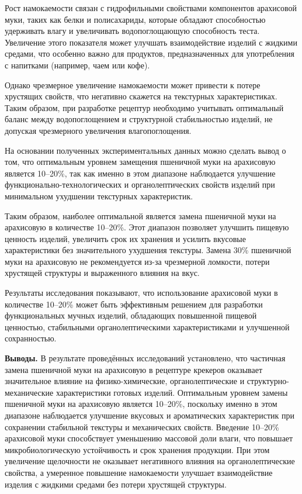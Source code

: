\begin{multicols}{2}
Рост намокаемости связан с гидрофильными свойствами компонентов
арахисовой муки, таких как белки и полисахариды, которые обладают
способностью удерживать влагу и увеличивать водопоглощающую способность
теста. Увеличение этого показателя может улучшать взаимодействие изделий
с жидкими средами, что особенно важно для продуктов, предназначенных для
употребления с напитками (например, чаем или кофе).

Однако чрезмерное увеличение намокаемости может привести к потере
хрустящих свойств, что негативно скажется на текстурных характеристиках.
Таким образом, при разработке рецептур необходимо учитывать оптимальный
баланс между водопоглощением и структурной стабильностью изделий, не
допуская чрезмерного увеличения влагопоглощения.

На основании полученных экспериментальных данных можно сделать вывод о
том, что оптимальным уровнем замещения пшеничной муки на арахисовую
является 10--20\%, так как именно в этом диапазоне наблюдается улучшение
функционально-технологических и органолептических свойств изделий при
минимальном ухудшении текстурных характеристик.

Таким образом, наиболее оптимальной является замена пшеничной муки на
арахисовую в количестве 10--20\%. Этот диапазон позволяет улучшить
пищевую ценность изделий, увеличить срок их хранения и усилить вкусовые
характеристики без значительного ухудшения текстуры. Замена 30\%
пшеничной муки на арахисовую не рекомендуется из-за чрезмерной ломкости,
потери хрустящей структуры и выраженного влияния на вкус.

Результаты исследования показывают, что использование арахисовой муки в
количестве 10--20\% может быть эффективным решением для разработки
функциональных мучных изделий, обладающих повышенной пищевой ценностью,
стабильными органолептическими характеристиками и улучшенной
сохранностью.

{\bfseries Выводы.} В результате проведённых исследований установлено, что
частичная замена пшеничной муки на арахисовую в рецептуре крекеров
оказывает значительное влияние на физико-химические, органолептические и
структурно-механические характеристики готовых изделий. Оптимальным
уровнем замены пшеничной муки на арахисовую является 10--20\%, поскольку
именно в этом диапазоне наблюдается улучшение вкусовых и ароматических
характеристик при сохранении стабильной текстуры и механических свойств.
Введение 10--20\% арахисовой муки способствует уменьшению массовой доли
влаги, что повышает микробиологическую устойчивость и срок хранения
продукции. При этом увеличение щелочности не оказывает негативного
влияния на органолептические свойства, а умеренное повышение
намокаемости улучшает взаимодействие изделия с жидкими средами без
потери хрустящей структуры.


\end{multicols}
